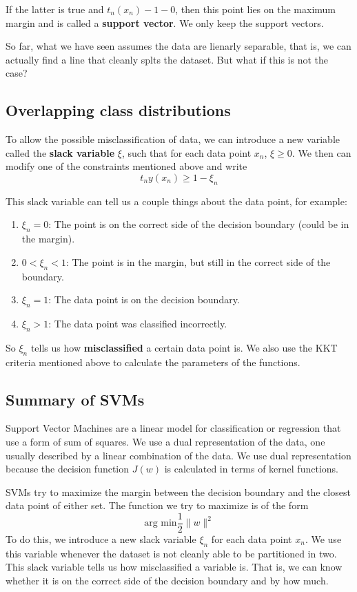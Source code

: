 \documentclass{tufte-handout}
\begin{document}
		If the latter is true and $t_{n}(x_{n}) - 1 -0$, then this point lies on the maximum margin and 
		is called a \textbf{support vector}. We only keep the support vectors.

		So far, what we have seen assumes the data are lienarly separable, that is, we can actually 
		find a line that cleanly splts the dataset. But what if this is not the case?
		\subsection{Overlapping class distributions}

		To allow the possible misclassification of data, we can introduce a new variable called the \textbf{slack
		variable} $\xi$, such that for each data point $x_{n}$, $\xi \geq 0$. We then can modify one of
		the constraints mentioned above and write 
		\[ t_{n}y(x_{n}) \geq 1 - \xi_{n}\]

		This slack variable can tell us a couple things about the data point, for example:
		\begin{enumerate}
				\item $\xi_{n} = 0$: The point is on the correct side of the decision boundary (could be in the
						margin).
				\item $0 < \xi_{n} < 1$: The point is in the margin, but still in the correct side of the 
						boundary.
				\item $\xi_{n} = 1$: The data point is on the decision boundary.
				\item $\xi_{n} > 1$: The data point was classified incorrectly.
		\end{enumerate}
		So $\xi_{n}$ tells us how \textbf{misclassified} a certain data point is. We also use the KKT criteria
		mentioned above to calculate the parameters of the functions.

		\subsection{Summary of SVMs}
		Support Vector Machines are a linear model for classification or regression that use a form of
		sum of squares. We use a dual representation of the data, one usually described by a linear
		combination of the data. We use dual representation because the decision function $J(w)$ is
		calculated in terms of kernel functions.

		SVMs try to maximize the margin between the decision boundary and the closest data point of either set.
		The function we try to maximize is of the form 
		\[ \textrm{arg min}\frac{1}{2}\|w\|^{2}\]
		To do this, we introduce a new slack variable $\xi_{n}$ for each data point $x_{n}$. We use this 
		variable whenever the dataset is not cleanly able to be partitioned in two.  This slack variable 
		tells us how misclassified a variable is. That is, we can know whether it is on the correct side
		of the decision boundary and by how much.
\end{document}
